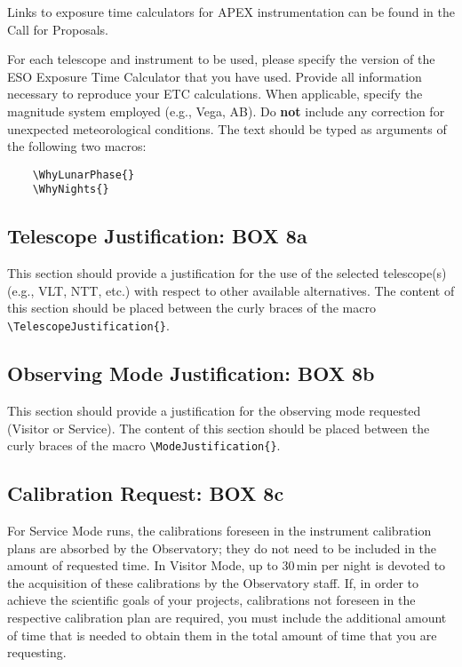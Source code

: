 \documentclass{article}
\begin{document}
Links to exposure time calculators for APEX instrumentation can be found in the Call for Proposals.

For each telescope and instrument to be used, please specify the
version of the ESO Exposure Time Calculator that you have
used. Provide all information necessary to reproduce your ETC calculations. When applicable, specify the magnitude system employed (e.g., Vega, AB). Do {\bf not} include any correction for unexpected
meteorological conditions. The text should be typed as arguments of
the following two macros:
\begin{verbatim}
    \WhyLunarPhase{}
    \WhyNights{}
\end{verbatim} 

\subsection{Telescope Justification: {\bf BOX 8a}}
This section should provide a justification for the use of the selected telescope(s) (e.g., VLT, NTT, etc.) with respect to other available alternatives. The content of this section should be placed between the curly
braces of the macro \verb|\TelescopeJustification{}|.

\subsection{Observing Mode Justification: {\bf BOX 8b}}
This section should provide a justification for the observing mode requested (Visitor or Service). The content of this section should be placed between the curly braces of the macro \verb|\ModeJustification{}|.

\subsection{Calibration Request: {\bf BOX 8c}}

For Service Mode runs, the calibrations foreseen in the instrument
calibration plans are 
absorbed by the Observatory; they do not need to be included in the
amount of requested time. In Visitor Mode, up to
30\,min per night is devoted to the acquisition of these calibrations
by the Observatory staff. If, in order to achieve the scientific goals
of your projects, calibrations not foreseen in the respective
calibration plan are required, you must include the additional amount
of time that is needed to obtain them in the total amount of time that
you are requesting. 
\end{document}
